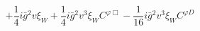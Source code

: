 %
\begin{dmath*}
%
  +  \frac{1}{4} i {\bar g}{}^2 v \xi_W   +  \frac{1}{4} i {\bar g}{}^2 v^3 \xi_WC^{ \varphi  \Box}  -  \frac{1}{16} i {\bar g}{}^2 v^3 \xi_WC^{ \varphi  D}
%
\end{dmath*}
%
